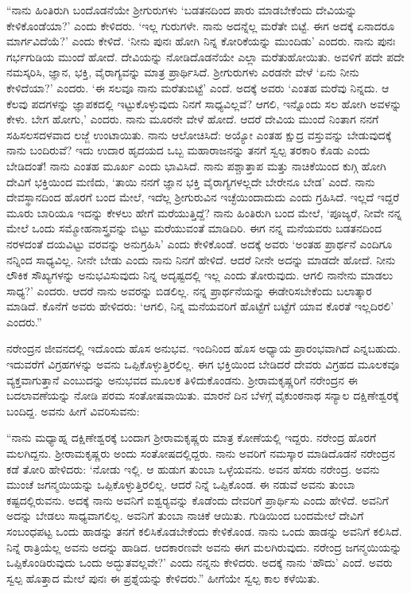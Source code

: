 “ನಾನು ಹಿಂತಿರುಗಿ ಬಂದೊಡನೆಯೇ ಶ‍್ರೀಗುರುಗಳು ‘ಬಡತನದಿಂದ ಪಾರು ಮಾಡಬೇಕೆಂದು ದೇವಿಯನ್ನು ಕೇಳಿಕೊಂಡೆಯಾ?’ ಎಂದು ಕೇಳಿದರು. ‘ಇಲ್ಲ ಗುರುಗಳೇ. ನಾನು ಅದನ್ನೆಲ್ಲ ಮರೆತೇ ಬಿಟ್ಟೆ. ಈಗ ಅದಕ್ಕೆ ಏನಾದರೂ ಮಾರ್ಗವಿದೆಯೆ?’ ಎಂದು ಕೇಳಿದೆ. ‘ನೀನು ಪುನಃ ಹೋಗಿ ನಿನ್ನ ಕೋರಿಕೆಯನ್ನು ಮುಂದಿಡು’ ಎಂದರು. ನಾನು ಪುನಃ ಗರ್ಭಗುಡಿಯ ಮುಂದೆ ಹೋದೆ. ದೇವಿಯನ್ನು ನೋಡಿದೊಡನೆಯೇ ಎಲ್ಲಾ ಮರೆತುಹೋಯಿತು. ಅವಳಿಗೆ ಪದೇ ಪದೇ ನಮಸ್ಕರಿಸಿ, ಜ್ಞಾನ, ಭಕ್ತಿ, ವೈರಾಗ್ಯವನ್ನು ಮಾತ್ರ ಪ್ರಾರ್ಥಿಸಿದೆ. ಶ‍್ರೀಗುರುಗಳು ಎರಡನೇ ವೇಳೆ ‘ಏನು ನೀನು ಕೇಳಿದೆಯಾ?’ ಎಂದರು. ‘ಈ ಸಲವೂ ನಾನು ಮರೆತುಬಿಟ್ಟೆ’ ಎಂದೆ. ಅದಕ್ಕೆ ಅವರು ‘ಎಂತಹ ಮರೆವು ನಿನ್ನದು. ಆ ಕೆಲವು ಪದಗಳನ್ನು ಜ್ಞಾಪಕದಲ್ಲಿ ಇಟ್ಟುಕೊಳ್ಳುವುದು ನಿನಗೆ ಸಾಧ್ಯವಿಲ್ಲವೆ? ಆಗಲಿ, ಇನ್ನೊಂದು ಸಲ ಹೋಗಿ ಅವಳನ್ನು ಕೇಳು. ಬೇಗ ಹೋಗು,’ ಎಂದರು. ನಾನು ಮೂರನೇ ವೇಳೆ ಹೋದೆ. ಆದರೆ ದೇವಿಯ ಮುಂದೆ ನಿಂತಾಗ ನನಗೆ ಸಹಿಸಲಸದಳವಾದ ಲಜ್ಜೆ ಉಂಟಾಯಿತು. ನಾನು ಆಲೋಚಿಸಿದೆ: ಅಯ್ಯೋ ಎಂತಹ ಕ್ಷುದ್ರ ವಸ್ತುವನ್ನು ಬೇಡುವುದಕ್ಕೆ ನಾನು ಬಂದಿರುವೆ? ಇದು ಉದಾರ ಹೃದಯದ ಒಬ್ಬ ಮಹಾರಾಜನನ್ನು ತನಗೆ ಸ್ವಲ್ಪ ತರಕಾರಿ ಕೊಡು ಎಂದು ಬೇಡಿದಂತೆ! ನಾನು ಎಂತಹ ಮೂರ್ಖ ಎಂದು ಭಾವಿಸಿದೆ. ನಾನು ಪಶ್ಚಾತ್ತಾಪ ಮತ್ತು ನಾಚಿಕೆಯಿಂದ ಕುಗ್ಗಿ ಹೋಗಿ ದೇವಿಗೆ ಭಕ್ತಿಯಿಂದ ಮಣಿದು, ‘ತಾಯಿ ನನಗೆ ಜ್ಞಾನ ಭಕ್ತಿ ವೈರಾಗ್ಯಗಳಲ್ಲದೇ ಬೇರೇನೂ ಬೇಡ’ ಎಂದೆ. ನಾನು ದೇವಸ್ಥಾನದಿಂದ ಹೊರಗೆ ಬಂದ ಮೇಲೆ, ಇದೆಲ್ಲ ಶ‍್ರೀಗುರುವಿನ ಇಚ್ಛೆಯಿಂದಾದುದು ಎಂದು ಗ್ರಹಿಸಿದೆ. ಇಲ್ಲದೆ ಇದ್ದರೆ ಮೂರು ಬಾರಿಯೂ ಇದನ್ನು ಕೇಳಲು ಹೇಗೆ ಮರೆಯುತ್ತಿದ್ದೆ? ನಾನು ಹಿಂತಿರುಗಿ ಬಂದ ಮೇಲೆ, ‘ಪೂಜ್ಯರೆ, ನೀವೇ ನನ್ನ ಮೇಲೆ ಒಂದು ಸಮ್ಮೋಹನಾಸ್ತ್ರವನ್ನು ಬಿಟ್ಟು ಮರೆಯುವಂತೆ ಮಾಡಿದಿರಿ. ಈಗ ನನ್ನ ಮನೆಯವರು ಬಡತನದಿಂದ ನರಳದಂತೆ ದಯವಿಟ್ಟು ವರವನ್ನು ಅನುಗ್ರಹಿಸಿ’ ಎಂದು ಕೇಳಿಕೊಂಡೆ. ಅದಕ್ಕೆ ಅವರು ‘ಅಂತಹ ಪ್ರಾರ್ಥನೆ ಎಂದಿಗೂ ನನ್ನಿಂದ ಸಾಧ್ಯವಿಲ್ಲ. ನೀನೇ ಬೇಡು ಎಂದು ನಾನು ನಿನಗೆ ಹೇಳಿದೆ. ಆದರೆ ನೀನೇ ಅದನ್ನು ಮಾಡದೇ ಹೋದೆ. ನೀನು ಲೌಕಿಕ ಸೌಖ್ಯಗಳನ್ನು ಅನುಭವಿಸುವುದು ನಿನ್ನ ಅದೃಷ್ಟದಲ್ಲಿ ಇಲ್ಲ ಎಂದು ತೋರುವುದು. ಆಗಲಿ ನಾನೇನು ಮಾಡಲು ಸಾಧ್ಯ?’ ಎಂದರು. ಆದರೆ ನಾನು ಅವರನ್ನು ಬಿಡಲಿಲ್ಲ. ನನ್ನ ಪ್ರಾರ್ಥನೆಯನ್ನು ಈಡೇರಿಸಬೇಕೆಂದು ಬಲಾತ್ಕಾರ ಮಾಡಿದೆ. ಕೊನೆಗೆ ಅವರು ಹೇಳಿದರು: ‘ಆಗಲಿ, ನಿನ್ನ ಮನೆಯವರಿಗೆ ಹೊಟ್ಟೆಗೆ ಬಟ್ಟೆಗೆ ಯಾವ ಕೊರತೆ ಇಲ್ಲದಿರಲಿ’ ಎಂದರು.”

ನರೇಂದ್ರನ ಜೀವನದಲ್ಲಿ ಇದೊಂದು ಹೊಸ ಅನುಭವ. ಇಂದಿನಿಂದ ಹೊಸ ಅಧ್ಯಾಯ ಪ್ರಾರಂಭವಾಗಿದೆ ಎನ್ನಬಹುದು. ಇದುವರೆಗೆ ವಿಗ್ರಹಗಳನ್ನು ಅವನು ಒಪ್ಪಿಕೊಳ್ಳುತ್ತಿರಲಿಲ್ಲ. ಈಗ ಭಕ್ತಿಯಿಂದ ಬೇಡಿದರೆ ದೇವರು ವಿಗ್ರಹದ ಮೂಲಕವೂ ವ್ಯಕ್ತವಾಗುತ್ತಾನೆ ಎಂಬುದನ್ನು ಅನುಭವದ ಮೂಲಕ ತಿಳಿದುಕೊಂಡನು. ಶ‍್ರೀರಾಮಕೃಷ್ಣರಿಗೆ ನರೇಂದ್ರನ ಈ ಬದಲಾವಣೆಯನ್ನು ನೋಡಿ ಪರಮ ಸಂತೋಷವಾಯಿತು. ಮಾರನೆ ದಿನ ಬೆಳಗ್ಗೆ ವೈಕುಂಠನಾಥ ಸನ್ಯಾಲ ದಕ್ಷಿಣೇಶ್ವರಕ್ಕೆ ಬಂದಿದ್ದ. ಅವನು ಹೀಗೆ ವಿವರಿಸುವನು:

“ನಾನು ಮಧ್ಯಾಹ್ನ ದಕ್ಷಿಣೇಶ್ವರಕ್ಕೆ ಬಂದಾಗ ಶ‍್ರೀರಾಮಕೃಷ್ಣರು ಮಾತ್ರ ಕೋಣೆಯಲ್ಲಿ ಇದ್ದರು. ನರೇಂದ್ರ ಹೊರಗೆ ಮಲಗಿದ್ದನು. ಶ‍್ರೀರಾಮಕೃಷ್ಣರು ಅಂದು ಸಂತೋಷದಲ್ಲಿದ್ದರು. ನಾನು ಅವರಿಗೆ ನಮಸ್ಕಾರ ಮಾಡಿದೊಡನೆ ನರೇಂದ್ರನ ಕಡೆ ತೋರಿ ಹೇಳಿದರು: ‘ನೋಡು ಇಲ್ಲಿ. ಆ ಹುಡುಗ ತುಂಬಾ ಒಳ್ಳೆಯವನು. ಅವನ ಹೆಸರು ನರೇಂದ್ರ. ಅವನು ಮುಂಚೆ ಜಗನ್ಮಯಿಯನ್ನು ಒಪ್ಪಿಕೊಳ್ಳುತ್ತಿರಲಿಲ್ಲ. ಆದರೆ ನಿನ್ನೆ ಒಪ್ಪಿಕೊಂಡ. ಈ ನಡುವೆ ಅವನು ತುಂಬಾ ಕಷ್ಟದಲ್ಲಿರುವನು. ಅದಕ್ಕೆ ನಾನು ಅವನಿಗೆ ಐಶ್ವರ‍್ಯವನ್ನು ಕೊಡೆಂದು ದೇವರಿಗೆ ಪ್ರಾರ್ಥಿಸು ಎಂದು ಹೇಳಿದೆ. ಅವನಿಗೆ ಅದನ್ನು ಬೇಡಲು ಸಾಧ್ಯವಾಗಲಿಲ್ಲ. ಅವನಿಗೆ ತುಂಬಾ ನಾಚಿಕೆ ಆಯಿತು. ಗುಡಿಯಿಂದ ಬಂದಮೇಲೆ ದೇವಿಗೆ ಸಂಬಂಧಪಟ್ಟ ಒಂದು ಹಾಡನ್ನು ತನಗೆ ಕಲಿಸಿಕೊಡಬೇಕೆಂದು ಕೇಳಿಕೊಂಡ. ನಾನು ಒಂದು ಹಾಡನ್ನು ಅವನಿಗೆ ಕಲಿಸಿದೆ. ನಿನ್ನೆ ರಾತ್ರಿಯೆಲ್ಲ ಅವನು ಅದನ್ನು ಹಾಡಿದ. ಆದಕಾರಣವೇ ಅವನು ಈಗ ಮಲಗಿರುವುದು. ನರೇಂದ್ರ ಜಗನ್ಮಯಿಯನ್ನು ಒಪ್ಪಿಕೊಂಡಿರುವುದು ಒಂದು ಅದ್ಭುತವಲ್ಲವೇ?’ ಎಂದು ನನ್ನನು ಕೇಳಿದರು. ಅದಕ್ಕೆ ನಾನು ‘ಹೌದು’ ಎಂದೆ. ಅವರು ಸ್ವಲ್ಪ ಹೊತ್ತಾದ ಮೇಲೆ ಪುನಃ ಈ ಪ್ರಶ್ನೆಯನ್ನು ಕೇಳಿದರು.” ಹೀಗೆಯೇ ಸ್ವಲ್ಪ ಕಾಲ ಕಳೆಯಿತು.

